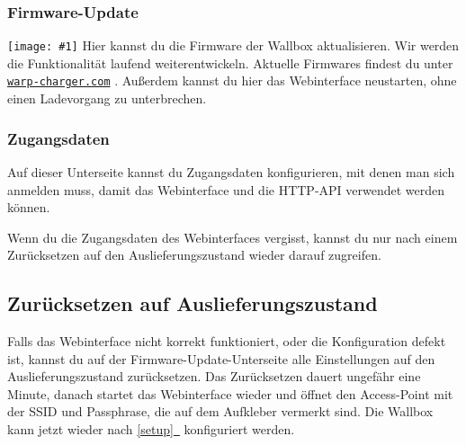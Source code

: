 \documentclass[a4paper,10pt]{article}
\newcommand{\hint}[1]{\begin{tcolorbox}[colback=boxgray,colframe=black,coltext=
white,title=Hinweis,left*=2mm,right*=2mm,boxsep=1mm,bottom=1mm,top=1mm]#1\end{tcolorbox}}
\newcommand{\gfx}[1]{\texttt{[image: \#1]}}
\newcommand*{\fullref}[1]{\hyperref[{#1}]{\ref*{#1}~\nameref*{#1}}}
\newcommand\rurl[2]{%
  \href{#1}{\nolinkurl{#2}}%
}
\begin{document}
\begin{multicols*}{2}
	\subsubsection{Firmware-Update}
	\gfx{./img_warp2/resized/web_firmware_update}
	Hier kannst du die Firmware der Wallbox aktualisieren. Wir werden die Funktionalität
	laufend weiterentwickeln. Aktuelle Firmwares findest du unter \rurl{https://warp-charger.com}{warp-charger.com}.
	Außerdem kannst du hier das Webinterface neustarten, ohne einen Ladevorgang zu unterbrechen.

	\subsubsection{Zugangsdaten}
	Auf dieser Unterseite kannst du Zugangsdaten konfigurieren, mit denen man sich anmelden muss,
	damit das Webinterface und die HTTP-API verwendet werden können.

	\hint{Wenn du die Zugangsdaten des Webinterfaces vergisst, kannst du nur nach einem Zurücksetzen
	auf den Auslieferungszustand wieder darauf zugreifen.}

	\subsection{Zurücksetzen auf Auslieferungszustand}\label{reset}
	Falls das Webinterface nicht korrekt funktioniert, oder die Konfiguration defekt ist,
	kannst du auf der Firmware-Update-Unterseite alle Einstellungen auf den Auslieferungszustand zurücksetzen.
	Das Zurücksetzen dauert ungefähr eine Minute, danach startet das Webinterface wieder und öffnet
	den Access-Point mit der SSID und Passphrase, die auf dem Aufkleber vermerkt sind. Die Wallbox kann jetzt wieder nach \fullref{setup} konfiguriert werden.


\end{multicols*}
\end{document}
